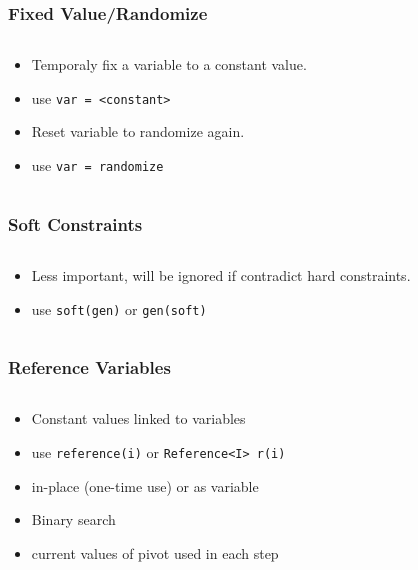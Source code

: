 \documentclass{RAbeamer}
\begin{document}
\begin{frame}[fragile]
  \frametitle{Fixed Value/Randomize}
  \begin{columns}
    \begin{column}[]{5.5cm}
      \begin{itemize}
        \item Temporaly fix a variable to a constant value.
        \item use \verb|var = <constant>|
        \item Reset variable to randomize again.
        \item use \verb|var = randomize|
      \end{itemize}
    \end{column}
      
    \begin{column}[c]{7cm}

    \end{column}
  \end{columns}
\end{frame}

\begin{frame}[fragile]
  \frametitle{Soft Constraints}
  \begin{columns}
    \begin{column}[]{5.5cm}
      \begin{itemize}
        \item Less important, will be ignored if contradict hard constraints.
        \item use \verb|soft(gen)| or \verb|gen(soft)|
      \end{itemize}
    \end{column}
      
    \begin{column}[c]{7cm}

    \end{column}
  \end{columns}
\end{frame}

\begin{frame}[fragile]
  \frametitle{Reference Variables}
  \begin{columns}
    \begin{column}[]{4.5cm}
      \begin{itemize}
        \item Constant values linked to variables
        \item use \verb|reference(i)| or \verb|Reference<I> r(i)|
        \item in-place (one-time use) or as variable
        \item Binary search
        \item current values of pivot used in each step
      \end{itemize}
    \end{column}
      
    \begin{column}[c]{7cm}

    \end{column}
  \end{columns}
\end{frame}
\end{document}
